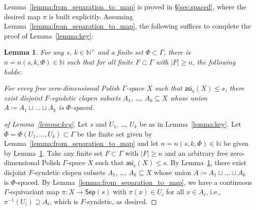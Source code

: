 \documentclass[11pt,reqno,psamsfonts]{amsart}
\theoremstyle{bfnote}
\newtheorem{lemma}[theo]{Lemma}
\theoremstyle{definition}
\theoremstyle{remark}
\newcommand{\0}{\varnothing}
\renewcommand{\leq}{\leqslant}
\renewcommand{\geq}{\geqslant}
\newcommand{\defeq}{\coloneqq}
\newcommand{\bemph}[1]{{\normalfont#1}}
\newcommand{\ep}[1]{\bemph{(}#1\bemph{)}}
\newcommand{\G}{\Gamma}
\newcommand{\N}{\mathbb{N}}
\newcommand{\asi}{\mathsf{asi}}
\newcommand{\casi}{\asi_{\mathsf{c}}}
\newcommand{\Sep}{\mathsf{Sep}}
\numberwithin{equation}{section}
\newenvironment{scproof}[1][]{\begin{proof}[\textsc{\upshape{Proof}}#1]}{\end{proof}}
\begin{document}
    Lemma~\ref{lemma:from_separation_to_map} is proved in \S\ref{sec:spaced}, where the desired map $\pi$ is built explicitly. Assuming Lemma~\ref{lemma:from_separation_to_map}, the following suffices to complete the proof of Lemma~\ref{lemma:key}:

    \begin{lemma}\label{lemma:sparse_syndetic}
        For any $s$, $k \in \N^+$ and a finite set $\Phi \subset \G$, there is $n = n(s,k, \Phi) \in \N$ such that for all finite $F \subset \G$ with $|F| \geq n$, the following holds:

        \smallskip
        
        \noindent For every free zero-dimensional Polish $\G$-space $X$ such that $\casi(X) \leq s$, there exist disjoint $F$-syndetic clopen subsets $A_1$, \ldots, $A_k \subseteq X$ whose union %
          $A \defeq A_1 \sqcup \ldots \sqcup A_k$ is $\Phi$-spaced.
    \end{lemma}

    \begin{scproof}[ of Lemma~\ref{lemma:key}]
        Let $s$ and $U_1$, \ldots, $U_k$ be as in Lemma~\ref{lemma:key}. Let $\Phi = \Phi(U_1,\ldots, U_k) \subset \G$ be the finite set given by Lemma~\ref{lemma:from_separation_to_map} and let $n = n(s,k, \Phi) \in \N$ be given by  Lemma~\ref{lemma:sparse_syndetic}. Take any finite set $F \subset \G$ with $|F| \geq n$ and an arbitrary free zero-dimensional Polish $\G$-space $X$ such that $\casi(X) \leq s$. By Lemma~\ref{lemma:sparse_syndetic}, there exist disjoint $F$-syndetic clopen subsets $A_1$, \ldots, $A_k \subseteq X$ whose union $A \defeq A_1 \sqcup \ldots \sqcup A_k$ is $\Phi$-spaced. %
        By Lemma~\ref{lemma:from_separation_to_map}, we have a continuous $\G$-equivariant map $\pi \colon X \to \Sep(s)$ with $\pi(x) \in U_i$ for all $x \in A_i$, i.e., %
        $\pi^{-1}(U_i) \supseteq A_i$, which is $F$-syndetic, as desired.
    \end{scproof}
\end{document}
